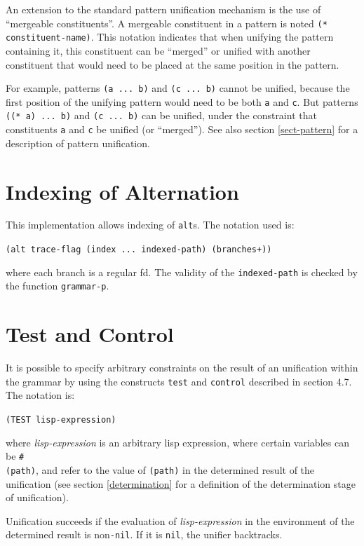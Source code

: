\documentclass[10pt,a4paper]{report}
\begin{document}
\begin{appendices}
An extension to the standard pattern unification mechanism is the
use of ``mergeable constituents''. A mergeable constituent in a
pattern is noted {\tt (* constituent-name)}. This notation indicates
that when unifying the pattern containing it, this constituent
can be ``merged'' or unified with another constituent that would
need to be placed at the same position in the pattern.

For example, patterns {\tt (a ... b)} and {\tt (c ... b)} cannot be
unified, because the first position of the unifying pattern would
need to be both {\tt a} and {\tt c}. But patterns {\tt ((* a) ... b)}
and {\tt (c ... b)} can be unified, under the constraint that
constituents {\tt a} and {\tt c} be unified (or ``merged''). See also section
\ref{sect-pattern} for a description of pattern unification.



\section{Indexing of Alternation}

This implementation allows indexing of {\tt alt}s. The notation used is:

{\tt (alt {trace-flag} {(index {...} indexed-path)} (branches+))}

where each branch is a regular fd. The validity of the
{\tt indexed-path} is checked by the function {\tt grammar-p}.



\section{Test and Control}

It is possible to specify arbitrary constraints on the result of
an unification within the grammar by using the constructs {\tt test}
and {\tt control} described in section 4.7. The notation is:

{\tt (TEST lisp-expression)}

where {\em lisp-expression} is an arbitrary lisp expression, where certain
variables can be {\tt \#\\(path)}, and refer to the value of {\tt (path)} in the
determined result of the unification (see section \ref{determination} for a
definition of the determination stage of unification).

Unification succeeds if the evaluation of {\em lisp-expression} in
the environment of the determined result is non{\tt -nil}. If it is
{\tt nil}, the unifier backtracks.


\end{appendices}
\end{document}
